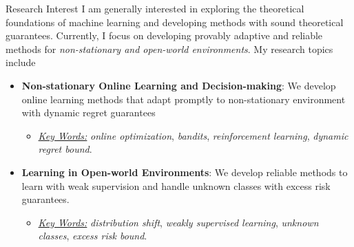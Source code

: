 \documentclass{resume} %
\begin{document}

\begin{rSection}{Research Interest}
I am generally interested in exploring the theoretical foundations of machine learning and developing methods with sound theoretical guarantees. Currently, I focus on developing provably adaptive and reliable methods for \emph{non-stationary and open-world environments}. My research topics include
\begin{itemize}
	\item \textbf{Non-stationary Online Learning and Decision-making}: We develop online learning methods that adapt promptly to non-stationary environment with dynamic regret guarantees\vspace{-0.5mm}
	\begin{itemize}[label = {-}, left=- 2mm]
		\item \underline{\emph{Key Words:}} \emph{online optimization}, \emph{bandits}, \emph{reinforcement learning}, \emph{dynamic regret bound}.
	\end{itemize}\vspace{1.5mm}
	\item \textbf{Learning in Open-world Environments}: We develop reliable methods to learn with weak supervision and handle unknown classes with excess risk guarantees.\vspace{-0.5mm}
	\begin{itemize}[label = {-}, left = -2mm]
		\item \underline{\emph{Key Words:}} \emph{distribution shift}, \emph{weakly supervised learning}, \emph{unknown classes}, \emph{excess risk bound}. 
	\end{itemize}
\end{itemize}
\end{rSection}
\end{document}
